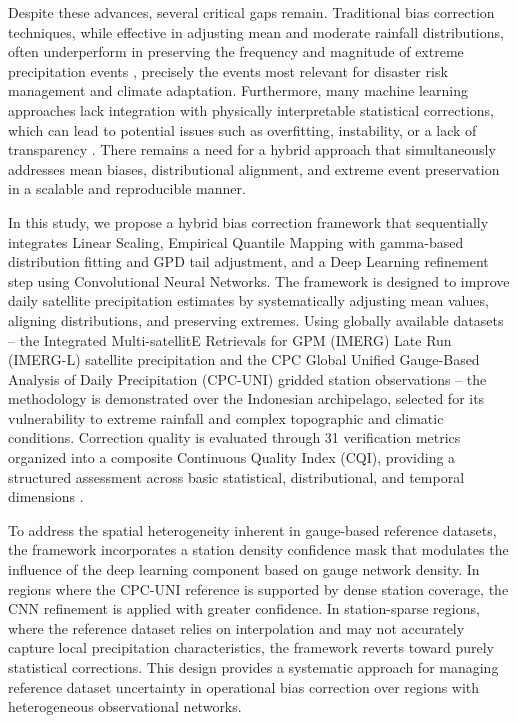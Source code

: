 \documentclass[11pt,a4paper]{article}
\begin{document}
Despite these advances, several critical gaps remain. Traditional bias
correction techniques, while effective in adjusting mean and moderate
rainfall distributions, often underperform in preserving the frequency
and magnitude of extreme precipitation events \cite{ref8,ref11}, precisely the
events most relevant for disaster risk management and climate
adaptation. Furthermore, many machine learning approaches lack
integration with physically interpretable statistical corrections, which
can lead to potential issues such as overfitting, instability, or a lack
of transparency \cite{ref12}. There remains a need for a hybrid approach
that simultaneously addresses mean biases, distributional alignment, and
extreme event preservation in a scalable and reproducible manner.

In this study, we propose a hybrid bias correction framework that
sequentially integrates Linear Scaling, Empirical Quantile Mapping with
gamma-based distribution fitting and GPD tail adjustment, and a Deep
Learning refinement step using Convolutional Neural Networks. The
framework is designed to improve daily satellite precipitation estimates
by systematically adjusting mean values, aligning distributions, and
preserving extremes. Using globally available datasets -- the Integrated
Multi-satellitE Retrievals for GPM (IMERG) Late Run (IMERG-L) satellite
precipitation \cite{ref2} and the CPC Global Unified Gauge-Based Analysis of
Daily Precipitation (CPC-UNI) gridded station observations \cite{ref13} --
the methodology is demonstrated over the Indonesian archipelago,
selected for its vulnerability to extreme rainfall and complex
topographic and climatic conditions. Correction quality is evaluated
through 31 verification metrics organized into a composite Continuous
Quality Index (CQI), providing a structured assessment across basic
statistical, distributional, and temporal dimensions \cite{ref14,ref15}.

To address the spatial heterogeneity inherent in gauge-based reference
datasets, the framework incorporates a station density confidence mask
that modulates the influence of the deep learning component based on
gauge network density. In regions where the CPC-UNI reference is
supported by dense station coverage, the CNN refinement is applied with
greater confidence. In station-sparse regions, where the reference
dataset relies on interpolation and may not accurately capture local
precipitation characteristics, the framework reverts toward purely
statistical corrections. This design provides a systematic approach for
managing reference dataset uncertainty in operational bias correction
over regions with heterogeneous observational networks.
\end{document}
